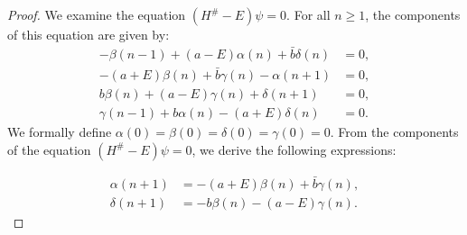 \documentclass{amsart}
\theoremstyle{definition}
\theoremstyle{remark}
\begin{document}
\begin{proof}
We examine the equation \((H^\# - E)\psi = 0\). For all \(n \geq 1\), the components of this equation are given by:
\begin{align*}
-\beta(n - 1) + (a - E)\alpha(n) + \bar{b}\delta(n) &= 0, \\
-(a + E)\beta(n) + \bar{b}\gamma(n) - \alpha(n + 1) &= 0, \\
b\beta(n) + (a - E)\gamma(n) + \delta(n + 1) &= 0, \\
\gamma(n - 1) + b\alpha(n) - (a + E)\delta(n) &= 0.
\end{align*}
We formally define \(\alpha(0) = \beta(0) = \delta(0) = \gamma(0) = 0\). From the components of the equation \((H^\# - E)\psi = 0\), we derive the following expressions:

\begin{align*}
\alpha(n + 1) &= -(a + E)\beta(n) + \bar{b}\gamma(n), \\
\delta(n + 1) &= -b\beta(n) - (a - E)\gamma(n).
\end{align*}


\end{proof}
\end{document}
